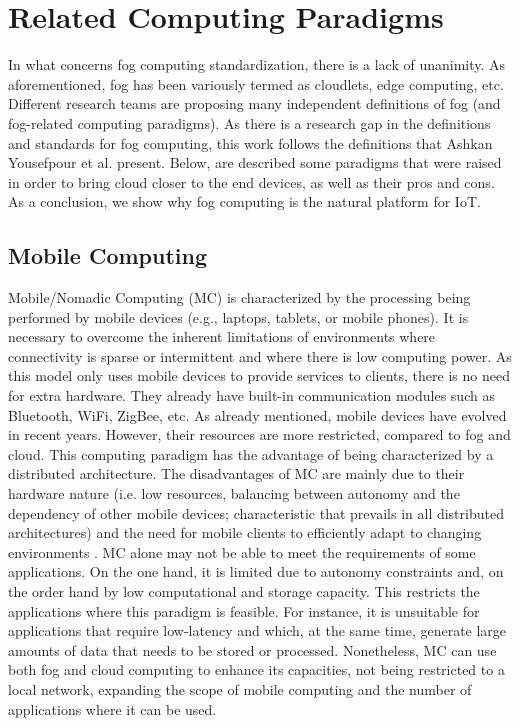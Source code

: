 \section{Related Computing Paradigms}
\label{sec:Computingparadigms}
In what concerns fog computing standardization, there is a lack of unanimity. As aforementioned, fog has been variously termed as cloudlets, edge computing, etc. Different research teams are proposing many independent definitions of fog (and fog-related computing paradigms). As there is a research gap in the definitions and standards for fog computing, this work follows the definitions that Ashkan Yousefpour et al. \cite{yousefpour2018all} present. Below, are described some paradigms that were raised in order to bring cloud closer to the end devices, as well as their pros and cons. As a conclusion, we show why fog computing is the natural platform for IoT.

\subsection{Mobile Computing}\label{subsec:MC}
Mobile/Nomadic Computing (MC) is characterized by the processing being performed by mobile devices (e.g., laptops, tablets, or mobile phones). It is necessary to overcome the inherent limitations of environments where connectivity is sparse or intermittent and where there is low computing power. As this model only uses mobile devices to provide services to clients, there is no need for extra hardware. They already have built-in communication modules such as Bluetooth, WiFi, ZigBee, etc. As already mentioned, mobile devices have evolved in recent years. However, their resources are more restricted, compared to fog and cloud. This computing paradigm has the advantage of being characterized by a distributed architecture. The disadvantages of MC are mainly due to their hardware nature (i.e. low resources, balancing between autonomy and the dependency of other mobile devices; characteristic that prevails in all distributed architectures) and the need for mobile clients to efficiently adapt to changing environments \cite{satyanarayanan1996fundamental}. MC alone may not be able to meet the requirements of some applications. On the one hand, it is limited due to autonomy constraints and, on the order hand by low computational and storage capacity. This restricts the applications where this paradigm is feasible. For instance, it is unsuitable for applications that require low-latency and which, at the same time, generate large amounts of data that needs to be stored or processed. Nonetheless, MC can use both fog and cloud computing to enhance its capacities, not being restricted to a local network, expanding the scope of mobile computing and the number of applications where it can be used.

